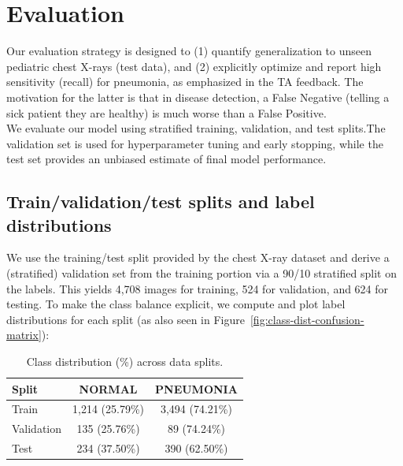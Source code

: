 \documentclass[11pt]{article}
\begin{document}
\section{Evaluation}


Our evaluation strategy is designed to (1) quantify generalization to unseen pediatric chest X-rays (test data), and (2) explicitly optimize and report high sensitivity (recall) for pneumonia, as emphasized in the TA feedback.
The motivation for the latter is that in disease detection, a False Negative (telling a sick patient they are healthy) is much worse than a False Positive.
\\
We evaluate our model using stratified training, validation, and test splits.The validation set is used for hyperparameter tuning and early stopping, while the test set provides an unbiased estimate of final model performance.

\subsection{Train/validation/test splits and label distributions}
We use the training/test split provided by the chest X-ray dataset and derive a (stratified) validation set from the training portion via a 90/10 stratified split on the labels. 
This yields 4,708 images for training, 524 for validation, and 624 for testing. To make the class balance explicit, we compute and plot label distributions for each split (as also seen in Figure~\ref{fig:class-dist-confusion-matrix}):

\begin{table}[h]
    \centering
    \begin{tabular}{lcc}
        \hline
        \textbf{Split} & \textbf{NORMAL} & \textbf{PNEUMONIA} \\
        \hline
        Train      & 1,214 (25.79\%) & 3,494 (74.21\%) \\
        Validation & 135 (25.76\%) & 89  (74.24\%) \\
        Test       & 234  (37.50\%) & 390  (62.50\%)\\
        \hline
    \end{tabular}
    \caption{Class distribution (\%) across data splits.}
    \label{fig:class-dist}
\end{table}
\end{document}
